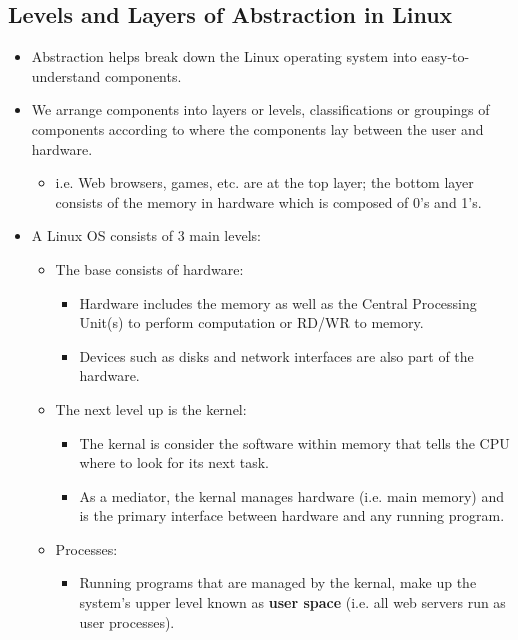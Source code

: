\documentclass{article}
\begin{document}
	\subsection{Levels and Layers of Abstraction in Linux}
	\begin{itemize}
		
		\item Abstraction helps break down the Linux operating system into easy-to-understand components.
		
		\item We arrange components into layers or levels, classifications or groupings of components according to where the components lay between the user and hardware.
		
		\begin{itemize}
			\item i.e. Web browsers, games, etc. are at the top layer; the bottom layer consists of the memory in hardware which is composed of 0's and 1's.
		\end{itemize}
	
		\item A Linux OS consists of 3 main levels:
		
		\begin{itemize}
			
			\item The base consists of hardware:
				\begin{itemize}
					\item Hardware includes the memory as well as the Central Processing Unit(s) to perform computation or RD/WR to memory.
					\item Devices such as disks and network interfaces are also part of the hardware.
				\end{itemize}
			
			\item The next level up is the kernel:
				\begin{itemize}
					\item The kernal is consider the software within memory that tells the CPU where to look for its next task.
					\item As a mediator, the kernal manages hardware (i.e. main memory) and is the primary interface between hardware and any running program.
				\end{itemize}
			
			\item Processes:
				\begin{itemize}
					\item Running programs that are managed by the kernal, make up the system's upper level known as {\bf user space} (i.e. all web servers run as user processes).
				\end{itemize}
		\end{itemize}
	\end{itemize}
	
\end{document}
